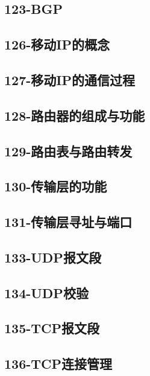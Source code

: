 \subsection{123-BGP}

\subsection{126-移动IP的概念}

\subsection{127-移动IP的通信过程}

\subsection{128-路由器的组成与功能}

\subsection{129-路由表与路由转发}

\subsection{130-传输层的功能}

\subsection{131-传输层寻址与端口}

\subsection{133-UDP报文段}

\subsection{134-UDP校验}

\subsection{135-TCP报文段}

\subsection{136-TCP连接管理}

